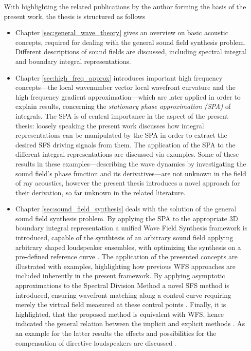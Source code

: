 With highlighting the related publications by the author forming the basis of the present work, the thesis is structured as follows
\begin{itemize}
\item Chapter \ref{sec:general_wave_theory} gives an overview on basic acoustic concepts, required for dealing with the general sound field synthesis problem.
Different descriptions of sound fields are discussed, including spectral integral and boundary integral representations.
%
\item Chapter \ref{sec:high_freq_approx} introduces important high frequency concepts---the local wavenumber  vector local wavefront curvature and the high frequency gradient approximation---which are later applied in order to explain results, concerning the \emph{stationary phase approximation (SPA)} of integrals.
The SPA is of central importance in the aspect of the present thesis: loosely speaking the present work discusses how integral representations can be manipulated by the SPA in order to extract the desired SFS driving signals from them.
The application of the SPA to the different integral representations are discussed via examples.
Some of these results in these examples---describing the wave dynamics by investigating the sound field's phase function and its derivatives---are not unknown in the field of ray acoustics, however the present thesis introduces a novel approach for their derivation, so far unknown in the related literature.
%
\item Chapter \ref{sec:sound_field_synthesis} deals with the solution of the general sound field synthesis problem.
By applying the SPA to the appropriate 3D boundary integral representation a unified Wave Field Synthesis framework is introduced, capable of the synthtesis of an arbitrary sound field applying arbitrary shaped loudspeaker ensembles, with optimizing the synthesis on a pre-defined reference curve \cite{Firtha2016, schultz2017wave}.
The application of the presented concepts are illustrated with examples, highlighting how previous WFS approaches are included inherently in the present framework.
By applying asymptotic approximations to the Spectral Division Method a novel SFS method is introduced, ensuring wavefront matching along a control curve requiring merely the virtual field measured at these control points \cite{Firtha2017:daga}.
Finally, it is highlighted, that the proposed method is equivalent with WFS, hence indicated the general relation between the implicit and explicit methods \cite{Firtha2018:WFS_vs_SDM}.
As an example for the latter results the effects and possibilities for the compensation of directive loudspeakers are discussed \cite{Firtha2018_daga_a}.

\end{itemize}
